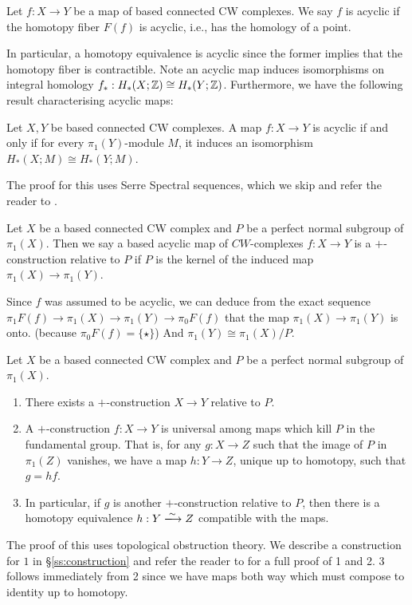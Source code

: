 \begin{definition}
Let $f : X \to Y$ be a map of based connected CW complexes. We say $f$ is acyclic if the homotopy fiber $F(f)$ is acyclic, i.e., has the homology of a point. 
\end{definition}
In particular, a homotopy equivalence is acyclic since the former implies that the homotopy fiber is contractible.
Note an acyclic map induces isomorphisms on integral homology $f_* : H_*(X;\mathbb{Z}) \cong H_*(Y;\mathbb{Z})$.
Furthermore, we have the following result characterising acyclic maps:

\begin{lemma}\label{lemma:acyclic}
Let $X, Y$ be based connected CW complexes. A map $f : X \to Y$ is acyclic if and only if for every $\pi_1(Y)$-module
$M$, it induces an isomorphism $H_*(X;M) \cong H_*(Y;M)$.
\end{lemma}
The proof for this uses Serre Spectral sequences, which we skip and refer the reader to \cite{Weibel}.

\begin{definition}
Let $X$ be a based connected CW complex and $P$ be a perfect normal subgroup of $\pi_1(X)$. 
Then we say a based acyclic map of $CW$-complexes $f : X \to Y$ is a $+$-construction
relative to $P$ if $P$ is the kernel of the induced map $\pi_1(X) \to \pi_1(Y)$.
\end{definition}

Since $f$ was assumed to be acyclic, we can deduce from the exact sequence $\pi_1 F(f) \to \pi_1(X) \to \pi_1(Y) \to \pi_0 F(f)$ that
the map $\pi_1(X) \to \pi_1(Y)$ is onto. (because $\pi_0 F(f) = \{\star\}$)
And $\pi_1(Y) \cong \pi_1(X)/P$.

\begin{theorem}[Quillen]\label{thm:plusexists}
Let $X$ be a based connected CW complex and $P$ be a perfect normal subgroup of $\pi_1(X)$.
\begin{enumerate}
  \item There exists a $+$-construction $X \to Y$ relative to $P$.
  \item A $+$-construction $f : X \to Y$ is universal among maps which kill $P$ in the fundamental group.
  That is, for any $g : X \to Z$ such that the image of $P$ in $\pi_1(Z)$ vanishes, we have a map $h : Y \to Z$, unique up to homotopy, such that $g = hf$. 
  \item In particular, if $g$ is another $+$-construction relative to $P$, then there is a homotopy equivalence $h : Y \xlongrightarrow{\sim} Z$ compatible with the maps.
\end{enumerate}
\end{theorem}
The proof of this uses topological obstruction theory. We describe a construction for $1$ in \S\ref{ss:construction}
and refer the reader to \cite{Berrick} for a full proof of 1 and 2. 3 follows immediately from 2 since we have maps both way which must compose to identity up to homotopy.

